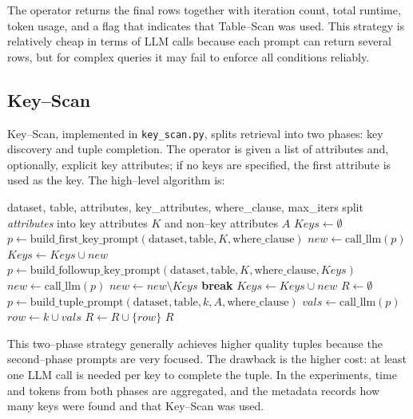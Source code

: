 \documentclass[11pt]{article}
\begin{document}
The operator returns the final rows together with iteration count, total runtime, token usage, and a flag that indicates that Table–Scan was used. This strategy is relatively cheap in terms of LLM calls because each prompt can return several rows, but for complex queries it may fail to enforce all conditions reliably.

\subsection{Key–Scan}

Key–Scan, implemented in \texttt{key\_scan.py}, splits retrieval into two phases: key discovery and tuple completion. The operator is given a list of attributes and, optionally, explicit key attributes; if no keys are specified, the first attribute is used as the key. The high–level algorithm is:

\begin{algorithm}[h]
\caption{Key–Scan}
\begin{algorithmic}[1]
\Require dataset, table, attributes, key\_attributes, where\_clause, max\_iters
\State split \textit{attributes} into key attributes $K$ and non–key attributes $A$
\State $Keys \gets \emptyset$ 
\State $p \gets \text{build\_first\_key\_prompt}(\text{dataset},\text{table},K,\text{where\_clause})$
\State $new \gets \text{call\_llm}(p)$
\State $Keys \gets Keys \cup new$
  \State $p \gets \text{build\_followup\_key\_prompt}(\text{dataset},\text{table},K,\text{where\_clause},Keys)$
  \State $new \gets \text{call\_llm}(p)$
  \State $new \gets new \setminus Keys$
   \State \textbf{break} \EndIf
  \State $Keys \gets Keys \cup new$
\EndFor
\State $R \gets \emptyset$ 
  \State $p \gets \text{build\_tuple\_prompt}(\text{dataset},\text{table},k,A,\text{where\_clause})$
  \State $vals \gets \text{call\_llm}(p)$
  \State $row \gets k \cup vals$
  \State $R \gets R \cup \{row\}$
\EndFor
\State \Return $R$
\end{algorithmic}
\end{algorithm}

This two–phase strategy generally achieves higher quality tuples because the second–phase prompts are very focused. The drawback is the higher cost: at least one LLM call is needed per key to complete the tuple. In the experiments, time and tokens from both phases are aggregated, and the metadata records how many keys were found and that Key–Scan was used.
\end{document}

